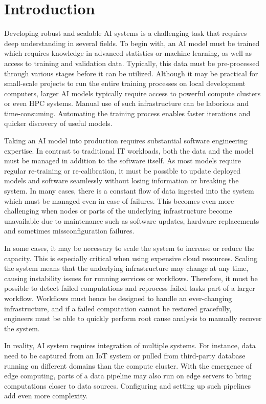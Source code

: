 \documentclass{article}
\begin{document}
\section{Introduction}
Developing robust and scalable AI systems is a challenging task that requires deep understanding in several fields. To begin with, an AI model must be trained which requires knowledge in advanced statistics or machine learning, as well as access to training and validation data. Typically, this data must be pre-processed through various stages before it can be utilized. Although it may be practical for small-scale projects to run the entire training processes on local development computers, larger AI models typically require access to powerful compute clusters or even HPC systems. Manual use of such infrastructure can be laborious and time-consuming. Automating the training process enables faster iterations and quicker discovery of useful models.

Taking an AI model into production requires substantial software engineering expertise. In contrast to traditional IT workloads, both the data and the model must be managed in addition to the software itself. As most models require regular re-training or re-calibration, it must be possible to update deployed models and software seamlessly without losing information or breaking the system. In many cases, there is a constant flow of data ingested into the system which must be managed even in case of failures. This becomes even more challenging when nodes or parts of the underlying infrastructure become unavailable due to maintenance such as software updates, hardware replacements and sometimes missconfiguration failures.

In some cases, it may be necessary to scale the system to increase or reduce the capacity. This is especially critical when using expensive cloud resources. Scaling the system means that the underlying infrastructure may change at any time, causing instability issues for running services or workflows. Therefore, it must be possible to detect failed computations and reprocess failed tasks part of a larger workflow. Workflows must hence be designed to handle an ever-changing infrastructure, and if a failed computation cannot be restored gracefully, engineers must be able to quickly perform root cause analysis to manually recover the system.

In reality, AI system requires integration of multiple systems. For instance, data need to be captured from an IoT system or pulled from third-party database running on different domains than the compute cluster. With the emergence of edge computing, parts of a data pipeline may also run on edge servers to bring computations closer to data sources. Configuring and setting up such pipelines add even more complexity.
\end{document}

